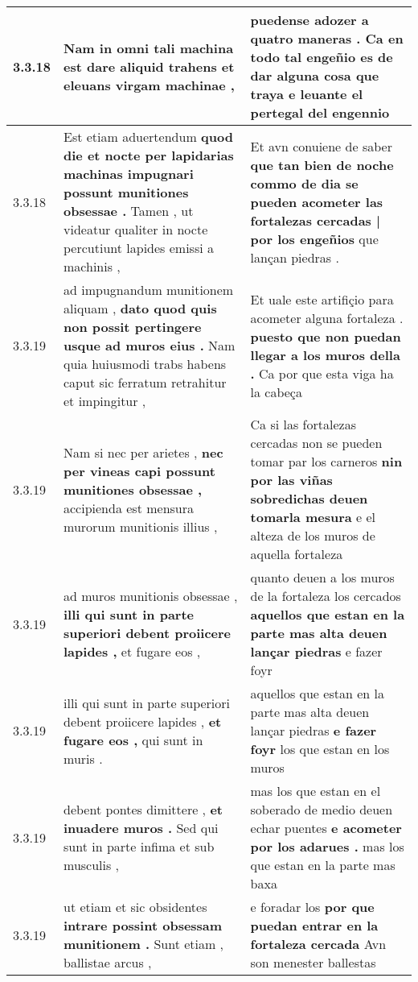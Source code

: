 \begin{tabular}{|p{1cm}|p{6.5cm}|p{6.5cm}|}
3.3.18 & Nam in omni tali machina est \textbf{ dare aliquid trahens } et eleuans virgam machinae , & puedense adozer a quatro maneras . \textbf{ Ca en todo tal engeñio es de dar alguna cosa que traya } e leuante el pertegal del engennio \\\hline
3.3.18 & Est etiam aduertendum \textbf{ quod die et nocte per lapidarias machinas impugnari possunt munitiones obsessae . } Tamen , ut videatur qualiter in nocte percutiunt lapides emissi a machinis , & Et avn conuiene de saber \textbf{ que tan bien de noche commo de dia se pueden acometer las fortalezas cercadas | por los engeñios } que lançan piedras . \\\hline
3.3.19 & ad impugnandum munitionem aliquam , \textbf{ dato quod quis non possit pertingere usque ad muros eius . } Nam quia huiusmodi trabs habens caput sic ferratum retrahitur et impingitur , & Et uale este artifiçio para acometer alguna fortaleza . \textbf{ puesto que non puedan llegar a los muros della . } Ca por que esta viga ha la cabeça \\\hline
3.3.19 & Nam si nec per arietes , \textbf{ nec per vineas capi possunt munitiones obsessae , } accipienda est mensura murorum munitionis illius , & Ca si las fortalezas cercadas non se pueden tomar par los carneros \textbf{ nin por las viñas sobredichas deuen tomarla mesura } e el alteza de los muros de aquella fortaleza \\\hline
3.3.19 & ad muros munitionis obsessae , \textbf{ illi qui sunt in parte superiori debent proiicere lapides , } et fugare eos , & quanto deuen a los muros de la fortaleza los cercados \textbf{ aquellos que estan en la parte mas alta deuen lançar piedras } e fazer foyr \\\hline
3.3.19 & illi qui sunt in parte superiori debent proiicere lapides , \textbf{ et fugare eos , } qui sunt in muris . & aquellos que estan en la parte mas alta deuen lançar piedras \textbf{ e fazer foyr } los que estan en los muros \\\hline
3.3.19 & debent pontes dimittere , \textbf{ et inuadere muros . } Sed qui sunt in parte infima et sub musculis , & mas los que estan en el soberado de medio deuen echar puentes \textbf{ e acometer por los adarues . } mas los que estan en la parte mas baxa \\\hline
3.3.19 & ut etiam et sic obsidentes \textbf{ intrare possint obsessam munitionem . } Sunt etiam , ballistae arcus , & e foradar los \textbf{ por que puedan entrar en la fortaleza cercada } Avn son menester ballestas \\\hline

\end{tabular}

